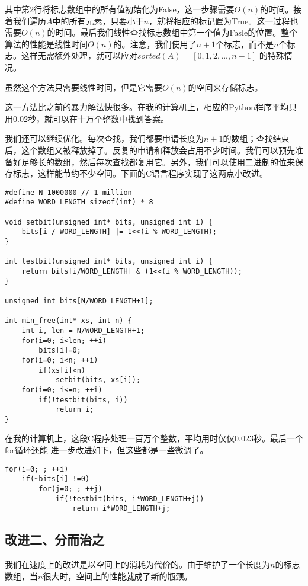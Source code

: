 \documentclass[UTF8]{article}
\begin{document}
其中第2行将标志数组中的所有值初始化为False，这一步骤需要$O(n)$的时间。接着我们遍历$A$中的所有元素，只要小于$n$，就将相应的标记置为True。这一过程也需要$O(n)$的时间。最后我们线性查找标志数组中第一个值为Fasle的位置。整个算法的性能是线性时间$O(n)$的。注意，我们使用了$n+1$个标志，而不是$n$个标志。这样无需额外处理，就可以应对$sorted(A) = [0, 1, 2, ..., n-1]$
的特殊情况。

虽然这个方法只需要线性时间，但是它需要$O(n)$的空间来存储标志。

这一方法比之前的暴力解法快很多。在我的计算机上，相应的Python程序平均只用0.02秒，就可以在十万个整数中找到答案。

我们还可以继续优化。每次查找，我们都要申请长度为$n+1$的数组；查找结束后，这个数组又被释放掉了。反复的申请和释放会占用不少时间。我们可以预先准备好足够长的数组，然后每次查找都复用它。另外，我们可以使用二进制的位来保存标志，这样能节约不少空间。下面的C语言程序实现了这两点小改进。

\lstset{language=C}
\begin{lstlisting}
#define N 1000000 // 1 million
#define WORD_LENGTH sizeof(int) * 8

void setbit(unsigned int* bits, unsigned int i) {
    bits[i / WORD_LENGTH] |= 1<<(i % WORD_LENGTH);
}

int testbit(unsigned int* bits, unsigned int i) {
    return bits[i/WORD_LENGTH] & (1<<(i % WORD_LENGTH));
}

unsigned int bits[N/WORD_LENGTH+1];

int min_free(int* xs, int n) {
    int i, len = N/WORD_LENGTH+1;
    for(i=0; i<len; ++i)
        bits[i]=0;
    for(i=0; i<n; ++i)
        if(xs[i]<n)
            setbit(bits, xs[i]);
    for(i=0; i<=n; ++i)
        if(!testbit(bits, i))
            return i;
}
\end{lstlisting}

在我的计算机上，这段C程序处理一百万个整数，平均用时仅仅0.023秒。最后一个for循环还能
进一步改进如下，但这些都是一些微调了。

\begin{lstlisting}
for(i=0; ; ++i)
    if(~bits[i] !=0)
        for(j=0; ; ++j)
	        if(!testbit(bits, i*WORD_LENGTH+j))
	            return i*WORD_LENGTH+j;
\end{lstlisting}

\subsection{改进二、分而治之}
我们在速度上的改进是以空间上的消耗为代价的。由于维护了一个长度为$n$的标志数组，当$n$很大时，空间上的性能就成了新的瓶颈。
\end{document}
